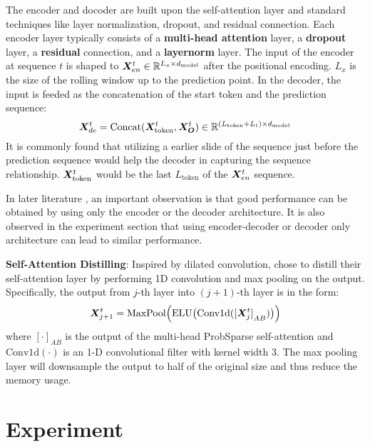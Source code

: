 \documentclass{article} %
\begin{document}
The encoder and docoder are built upon the self-attention layer and standard techniques like layer normalization, dropout, and residual connection.
Each encoder layer typically consists of a \textbf{multi-head attention} layer, a \textbf{dropout} layer, a \textbf{residual} connection, and a \textbf{layernorm} layer.
The input of the encoder at sequence $t$ is shaped to ${\bm{X}}_{en}^{t} \in \mathbb{R}^{L_{x} \times d_{\mathrm{model}}}$ after the positional encoding.
$L_{x}$ is the size of the rolling window up to the prediction point.
In the decoder, the input is feeded as the concatenation of the start token and the prediction sequence:
\begin{equation}
        {\bm{X}}_{de}^{t} = \mathrm{Concat} ( {\bm{X}}_{\mathrm{token}}^{t}, {\bm{X}}_{{\bm{O}}}^{t} ) \in \mathbb{R}^{(L_{\mathrm{token}} + L_{t}) \times d_{\mathrm{model}}}
\end{equation}
It is commonly found that utilizing a earlier slide of the sequence just before the prediction sequence would help the decoder in capturing the sequence relationship.
${\bm{X}}_{\mathrm{token}}^{t}$ would be the last $L_{\mathrm{token}}$ of the ${\bm{X}}_{en}^{t}$ sequence.

In later literature \citep{devlin-etal-2019-bert, radford2019language}, an important observation is that good performance can be obtained by using only the encoder or the decoder architecture.
It is also observed in the experiment section that using encoder-decoder or decoder only architecture can lead to similar performance.

\textbf{Self-Attention Distilling}:
Inspired by dilated convolution, \citet{haoyietal-informer-2021} chose to distill their self-attention layer by performing 1D convolution and max pooling on the output.
Specifically, the output from $j$-th layer into $(j+1)$-th layer is in the form:
\begin{equation}
{\bm{X}}_{j+1}^{t} = \mathrm{MaxPool} \Big( \mathrm{ELU} \big( \mathrm{Conv1d} ( {[{\bm{X}}_{j}^{t}]}_{AB} ) \big) \Big)
\end{equation}
where ${[\cdot]}_{AB}$ is the output of the multi-head ProbSparse self-attention and $\mathrm{Conv1d}(\cdot)$ is an 1-D convolutional filter with kernel width 3.
The max pooling layer will downsample the output to half of the original size and thus reduce the memory usage.

\section{Experiment}
\end{document}
